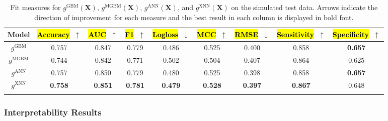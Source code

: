 \documentclass[information,article,accept,moreauthors,pdftex]{Definitions/mdpi}
\begin{document}
{{{\begin{table}[H]%
	\caption{Fit measures for $g^\text{GBM}(\mathbf{X})$, $g^\text{MGBM}(\mathbf{X})$, $g^\text{ANN}(\mathbf{X})$, and $g^\text{XNN}(\mathbf{X})$ on the simulated test data. Arrows indicate the direction of improvement for each measure and the best result in each column is displayed in bold font.}
	\centering
	\begin{tabular}{ccccccccc}
		\toprule
		\textbf{Model} & 
		{\textbf{\hl{Accuracy}}}~$\uparrow$ & 
		{\textbf{\hl{AUC}}}~$\uparrow$ & 
		{\textbf{\hl{F1}}}~$\uparrow$ & 
		{\textbf{\hl{Logloss}}}~$\downarrow$ & 
		{\textbf{\hl{MCC}}}~$\uparrow$ & 
		{\textbf{\hl{RMSE}}}~$\downarrow$ & 
		{\textbf{\hl{Sensitivity}}}~$\uparrow$ & 
		{\textbf{\hl{Specificity}}}~$\uparrow$ \\
		\midrule
		$g^\text{GBM}$		& 0.757 & 0.847 & 0.779 & 0.486 & 0.525 & 0.400 & 0.858 & \textbf{0.657} \\
		$g^\text{MGBM}$		& 0.744 & 0.842 & 0.771 & 0.502 & 0.504 & 0.407 & 0.864 & 0.625 \\
		$g^\text{ANN}$		& 0.757	& 0.850	& 0.779 & 0.480 & 0.525 & 0.398 & 0.858 & \textbf{0.657} \\
		$g^\text{XNN}$		& \textbf{0.758}	& \textbf{0.851}	& \textbf{0.781} & \textbf{0.479} & \textbf{0.528} & \textbf{0.397} & \textbf{0.867} & 0.648 \\
		\bottomrule
		\label{tab:sim_acc}
	\end{tabular}
\end{table}

\subsubsection{Interpretability Results}\label{ssec:xnn_sim}

}}}
\end{document}
